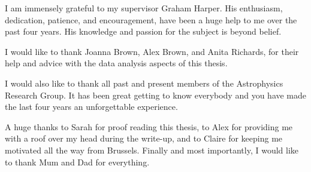 




\begin{acknowledgements}      

I am immensely grateful to my supervisor Graham Harper. His enthusiasm, dedication, patience, and encouragement, have been a huge help to me over the past four years. His knowledge and passion for the subject is beyond belief.

I would like to thank Joanna Brown, Alex Brown, and Anita Richards, for their help and advice with the data analysis aspects of this thesis.

I would also like to thank all past and present members of the Astrophysics Research Group. It has been great getting to know everybody and you have made the last four years an unforgettable experience.

A huge thanks to Sarah for proof reading this thesis, to Alex for providing me with a roof over my head during the write-up, and to Claire for keeping me motivated all the way from Brussels. Finally and most importantly, I would like to thank Mum and Dad for everything.

\end{acknowledgements}




